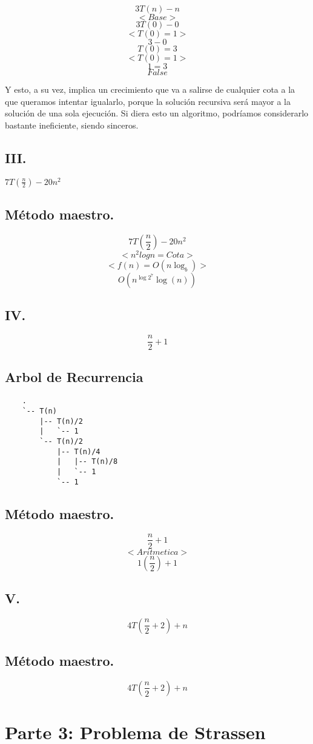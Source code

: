 \documentclass[12pt]{exam}
\begin{document}
$$ 3T(n) - n$$
$$ <Base> $$
$$ 3T(0) - 0 $$
$$ <T(0) = 1>  $$
$$ 3 - 0 $$
$$ T(0) = 3 $$
$$ <T(0) = 1>  $$
$$ 1 = 3 $$
$$ False $$

Y esto, a su vez, implica un crecimiento que va a salirse de cualquier
cota a la que queramos intentar igualarlo, porque la solución recursiva será
mayor a la solución de una sola ejecución. Si diera esto un algoritmo, podríamos
considerarlo bastante ineficiente, siendo sinceros.

\subsection*{III.}
$ 7T(\frac{n}{2}) -20n^2$


\subsection*{Método maestro.}
$$ 7T(\frac{n}{2}) -20n^2$$
$$ <n^2 log n=Cota> $$
$$ <f(n) = O(n \log_{b})> $$
$$ O(n^{\log{2}^7} \log(n)) $$

\subsection*{IV.}
$$ \frac{n}{2} + 1 $$
\subsection*{Arbol de Recurrencia}
\begin{verbatim}
    .
    `-- T(n)
        |-- T(n)/2
        |   `-- 1
        `-- T(n)/2
            |-- T(n)/4
            |   |-- T(n)/8
            |   `-- 1
            `-- 1
\end{verbatim}
\subsection*{Método maestro.}
$$ \frac{n}{2} + 1 $$
$$ <Aritmetica> $$
$$ 1(\frac{n}{2}) + 1 $$

\subsection*{V.}
$$ 4T(\frac{n}{2}+2) + n $$

\subsection*{Método maestro.}
$$ 4T(\frac{n}{2}+2) + n $$
$$  $$
\section*{Parte 3: Problema de Strassen}
\end{document}

